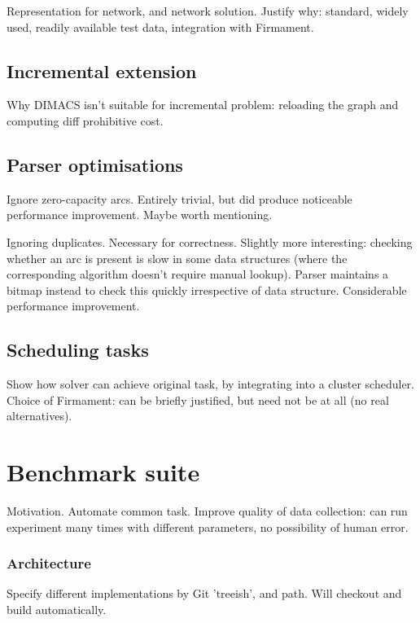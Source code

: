 Representation for network, and network solution. Justify why: standard, widely used, readily available test data, integration with Firmament. 

\subsection{Incremental extension}

Why DIMACS isn't suitable for incremental problem: reloading the graph and computing diff prohibitive cost. 

\subsection{Parser optimisations}

Ignore zero-capacity arcs. Entirely trivial, but did produce noticeable performance improvement. Maybe worth mentioning.

Ignoring duplicates. Necessary for correctness. Slightly more interesting: checking whether an arc is present is slow in some data structures (where the corresponding algorithm doesn't require manual lookup). Parser maintains a bitmap instead to check this quickly irrespective of data structure. Considerable performance improvement. 

\subsection{Scheduling tasks}

Show how solver can achieve original task, by integrating into a cluster scheduler. Choice of Firmament: can be briefly justified, but need not be at all (no real alternatives).

\section{Benchmark suite} \label{sec:impl-benchmark}

Motivation. Automate common task. Improve quality of data collection: can run experiment many times with different parameters, no possibility of human error. 

\subsubsection{Architecture}

Specify different implementations by Git 'treeish', and path. Will checkout and build automatically. 

